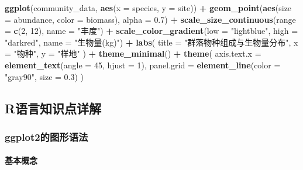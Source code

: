 \documentclass[
]{book}
\newenvironment{Shaded}{\begin{snugshade}}{\end{snugshade}}
\newcommand{\AttributeTok}[1]{\textcolor[rgb]{0.13,0.29,0.53}{#1}}
\newcommand{\DecValTok}[1]{\textcolor[rgb]{0.00,0.00,0.81}{#1}}
\newcommand{\FloatTok}[1]{\textcolor[rgb]{0.00,0.00,0.81}{#1}}
\newcommand{\FunctionTok}[1]{\textcolor[rgb]{0.13,0.29,0.53}{\textbf{#1}}}
\newcommand{\NormalTok}[1]{#1}
\newcommand{\SpecialCharTok}[1]{\textcolor[rgb]{0.81,0.36,0.00}{\textbf{#1}}}
\newcommand{\StringTok}[1]{\textcolor[rgb]{0.31,0.60,0.02}{#1}}
\begin{document}
\begin{Shaded}
\begin{Highlighting}[]
\FunctionTok{ggplot}\NormalTok{(community\_data, }\FunctionTok{aes}\NormalTok{(}\AttributeTok{x =}\NormalTok{ species, }\AttributeTok{y =}\NormalTok{ site)) }\SpecialCharTok{+}
  \FunctionTok{geom\_point}\NormalTok{(}\FunctionTok{aes}\NormalTok{(}\AttributeTok{size =}\NormalTok{ abundance, }\AttributeTok{color =}\NormalTok{ biomass), }\AttributeTok{alpha =} \FloatTok{0.7}\NormalTok{) }\SpecialCharTok{+}
  \FunctionTok{scale\_size\_continuous}\NormalTok{(}\AttributeTok{range =} \FunctionTok{c}\NormalTok{(}\DecValTok{2}\NormalTok{, }\DecValTok{12}\NormalTok{), }\AttributeTok{name =} \StringTok{"丰度"}\NormalTok{) }\SpecialCharTok{+}
  \FunctionTok{scale\_color\_gradient}\NormalTok{(}\AttributeTok{low =} \StringTok{"lightblue"}\NormalTok{, }\AttributeTok{high =} \StringTok{"darkred"}\NormalTok{, }\AttributeTok{name =} \StringTok{"生物量(kg)"}\NormalTok{) }\SpecialCharTok{+}
  \FunctionTok{labs}\NormalTok{(}
    \AttributeTok{title =} \StringTok{"群落物种组成与生物量分布"}\NormalTok{,}
    \AttributeTok{x =} \StringTok{"物种"}\NormalTok{,}
    \AttributeTok{y =} \StringTok{"样地"}
\NormalTok{  ) }\SpecialCharTok{+}
  \FunctionTok{theme\_minimal}\NormalTok{() }\SpecialCharTok{+}
  \FunctionTok{theme}\NormalTok{(}
    \AttributeTok{axis.text.x =} \FunctionTok{element\_text}\NormalTok{(}\AttributeTok{angle =} \DecValTok{45}\NormalTok{, }\AttributeTok{hjust =} \DecValTok{1}\NormalTok{),}
    \AttributeTok{panel.grid =} \FunctionTok{element\_line}\NormalTok{(}\AttributeTok{color =} \StringTok{"gray90"}\NormalTok{, }\AttributeTok{size =} \FloatTok{0.3}\NormalTok{)}
\NormalTok{  )}
\end{Highlighting}
\end{Shaded}

\hypertarget{rux8bedux8a00ux77e5ux8bc6ux70b9ux8be6ux89e3-9}{%
\subsection{R语言知识点详解}\label{rux8bedux8a00ux77e5ux8bc6ux70b9ux8be6ux89e3-9}}

\hypertarget{ggplot2ux7684ux56feux5f62ux8bedux6cd5}{%
\subsubsection{ggplot2的图形语法}\label{ggplot2ux7684ux56feux5f62ux8bedux6cd5}}

\hypertarget{ux57faux672cux6982ux5ff5}{%
\paragraph{基本概念}\label{ux57faux672cux6982ux5ff5}}
\end{document}
